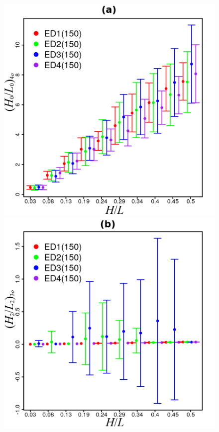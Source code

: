 \documentclass[12pt,A4,A4pt]{article}
\begin{document}
\begin{figure}[htbp]
\centering
\includegraphics[scale=.98]{imgs/plot_deall150_rdata_std_h0l0.png}
\quad
\includegraphics[scale=.98]{imgs/plot_deall150_rdata_std_h2l2.png}

\end{figure}
\end{document}
